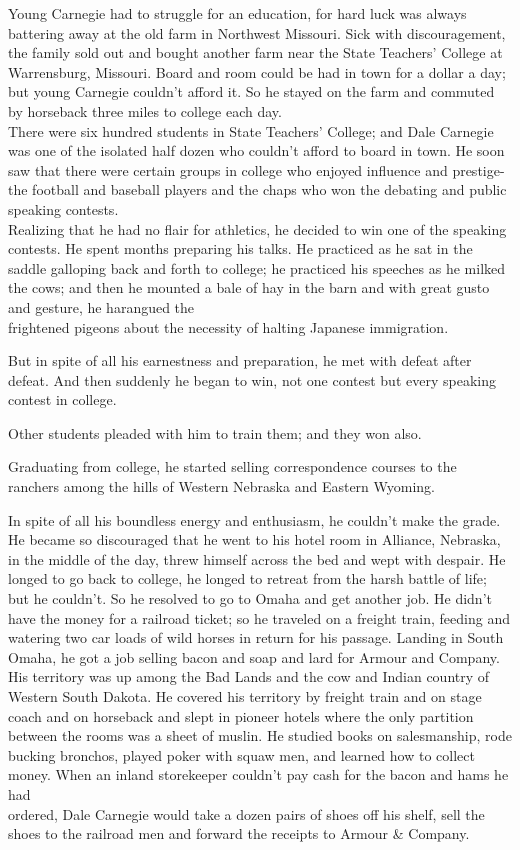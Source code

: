 \documentclass[10pt]{article}
\begin{document}
Young Carnegie had to struggle for an education, for hard luck was always battering away at the old farm in Northwest Missouri. Sick with discouragement, the family sold out and bought another farm near the State Teachers' College at Warrensburg, Missouri. Board and room could be had in town for a dollar a day; but young Carnegie couldn't afford it. So he stayed on the farm and commuted by horseback three miles to college each day.\\
There were six hundred students in State Teachers' College; and Dale Carnegie was one of the isolated half dozen who couldn't afford to board in town. He soon saw that there were certain groups in college who enjoyed influence and prestige-the football and baseball players and the chaps who won the debating and public speaking contests.\\
Realizing that he had no flair for athletics, he decided to win one of the speaking contests. He spent months preparing his talks. He practiced as he sat in the saddle galloping back and forth to college; he practiced his speeches as he milked the cows; and then he mounted a bale of hay in the barn and with great gusto and gesture, he harangued the\\
frightened pigeons about the necessity of halting Japanese immigration.

But in spite of all his earnestness and preparation, he met with defeat after defeat. And then suddenly he began to win, not one contest but every speaking contest in college.

Other students pleaded with him to train them; and they won also.

Graduating from college, he started selling correspondence courses to the ranchers among the hills of Western Nebraska and Eastern Wyoming.

In spite of all his boundless energy and enthusiasm, he couldn't make the grade. He became so discouraged that he went to his hotel room in Alliance, Nebraska, in the middle of the day, threw himself across the bed and wept with despair. He longed to go back to college, he longed to retreat from the harsh battle of life; but he couldn't. So he resolved to go to Omaha and get another job. He didn't have the money for a railroad ticket; so he traveled on a freight train, feeding and watering two car loads of wild horses in return for his passage. Landing in South Omaha, he got a job selling bacon and soap and lard for Armour and Company. His territory was up among the Bad Lands and the cow and Indian country of Western South Dakota. He covered his territory by freight train and on stage coach and on horseback and slept in pioneer hotels where the only partition between the rooms was a sheet of muslin. He studied books on salesmanship, rode bucking bronchos, played poker with squaw men, and learned how to collect money. When an inland storekeeper couldn't pay cash for the bacon and hams he had\\
ordered, Dale Carnegie would take a dozen pairs of shoes off his shelf, sell the shoes to the railroad men and forward the receipts to Armour \& Company.
\end{document}
